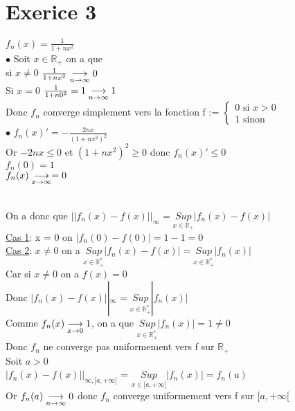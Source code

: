 \documentclass{article}
\author{Frederic Becerril}
\newcommand{\mysupp}[1]{\underset{x \in #1}{Sup}}
\begin{document}
\part*{Exerice 3}

$f_n(x) = \frac{1}{1 + nx^2}$\\
$\bullet$ Soit $x \in \mathbb{R}_+$ on a que\\
si $x \neq 0$ $\frac{1}{1 + nx^2} \mylim 0$\\
Si $x = 0$ $\frac{1}{1 + n0^2} = 1 \mylim 1$\\
Donc $f_n$ converge simplement vers la fonction f := $\left\{
\begin{array}{ll}
    0 \mbox{ si } x > 0\\
    1 \mbox{ sinon}
\end{array}
\right.$\\
$\bullet$ $f_n(x)' = -\frac{2nx}{(1 + nx^2)^2}$\\
Or $-2nx \leq 0$ et $(1 + nx^2)^2 \geq 0$ donc $f_n(x)' \leq 0$\\
$f_n(0) = 1$\\
$f_n(x) \mylim[x][\infty] = 0$\\
\\
On a donc que $||f_n(x) - f(x)||_\infty = \mysupp{\mathbb{R}_+} |f_n(x) - f(x)|$\\
\underline{Cas 1}: x = 0 on $|f_n(0) - f(0)| = 1 - 1 = 0$\\
\underline{Cas 2}: $x \neq 0$ on a $\mysupp{\mathbb{R}^*_+} |f_n(x) - f(x)| = \mysupp{\mathbb{R}^*_+} |f_n(x)|$\\
Car si $x \neq 0$ on a $f(x) = 0$\\
Donc $|f_n(x) - f(x)||_\infty = \mysupp{\mathbb{R}^*_+} |f_n(x)|$\\
Comme $f_n(x) \mylim[x][0] 1$, on a que $\mysupp{\mathbb{R}^*_+} |f_n(x)| = 1 \neq 0$\\
Donc $f_n$ ne converge pas uniformement vers f sur $\mathbb{R}_+$\\
Soit $a > 0$\\
$|f_n(x) - f(x)||_{\infty, [a, +\infty[}$ = $\mysupp{[a, +\infty[} |f_n(x)| = f_n(a)$\\
Or $f_n(a) \mylim 0$ donc $f_n$ converge uniformement vers f sur $[a, +\infty[$\\
\end{document}
